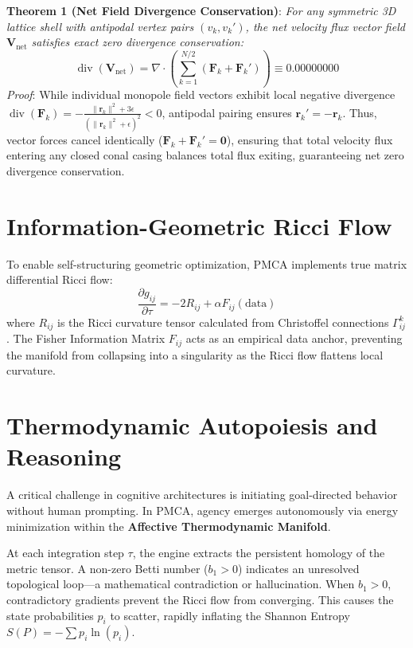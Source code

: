 \documentclass[12pt, a4paper]{article}
\begin{document}
\textbf{Theorem 1 (Net Field Divergence Conservation)}: \textit{For any symmetric 3D lattice shell with antipodal vertex pairs $(v_k, v_k')$, the net velocity flux vector field $\mathbf{V}_{\text{net}}$ satisfies exact zero divergence conservation:}
\begin{equation}
\operatorname{div}(\mathbf{V}_{\text{net}}) = \nabla \cdot \left(\sum_{k=1}^{N/2} (\mathbf{F}_k + \mathbf{F}_k')\right) \equiv 0.00000000
\end{equation}
\textit{Proof}: While individual monopole field vectors exhibit local negative divergence $\operatorname{div}(\mathbf{F}_k) = -\frac{\|\mathbf{r}_k\|^2 + 3\epsilon}{(\|\mathbf{r}_k\|^2 + \epsilon)^2} < 0$, antipodal pairing ensures $\mathbf{r}_k' = -\mathbf{r}_k$. Thus, vector forces cancel identically ($\mathbf{F}_k + \mathbf{F}_k' = \mathbf{0}$), ensuring that total velocity flux entering any closed conal casing balances total flux exiting, guaranteeing net zero divergence conservation.

\section{Information-Geometric Ricci Flow}

To enable self-structuring geometric optimization, PMCA implements true matrix differential Ricci flow:
\begin{equation}
\frac{\partial g_{ij}}{\partial \tau} = -2 R_{ij} + \alpha F_{ij}(\text{data})
\end{equation}
where $R_{ij}$ is the Ricci curvature tensor calculated from Christoffel connections $\Gamma^k_{ij}$. The Fisher Information Matrix $F_{ij}$ acts as an empirical data anchor, preventing the manifold from collapsing into a singularity as the Ricci flow flattens local curvature.

\section{Thermodynamic Autopoiesis and Reasoning}

A critical challenge in cognitive architectures is initiating goal-directed behavior without human prompting. In PMCA, agency emerges autonomously via energy minimization within the \textbf{Affective Thermodynamic Manifold}.

At each integration step $\tau$, the engine extracts the persistent homology of the metric tensor. A non-zero Betti number ($b_1 > 0$) indicates an unresolved topological loop—a mathematical contradiction or hallucination. When $b_1 > 0$, contradictory gradients prevent the Ricci flow from converging. This causes the state probabilities $p_i$ to scatter, rapidly inflating the Shannon Entropy $S(P) = - \sum p_i \ln(p_i)$.
\end{document}
